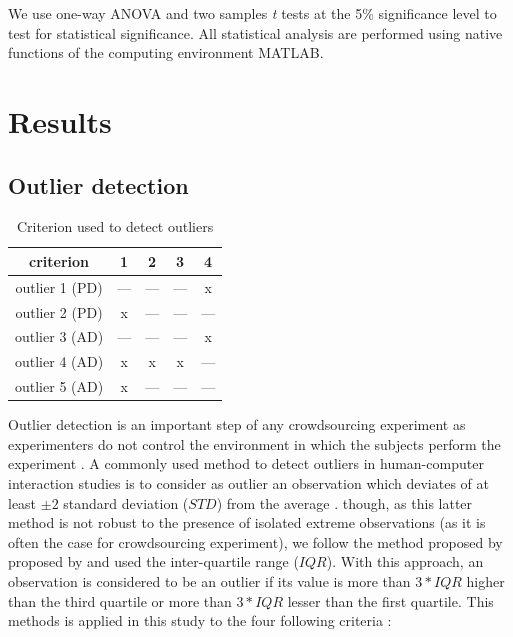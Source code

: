 \documentclass{aes2e}
\begin{document}
We use one-way ANOVA and two samples \textit{t} tests at the 5\% significance level to test for statistical significance. All statistical analysis are performed using native functions of the computing environment MATLAB.


\section{Results} \label{results}
\subsection{Outlier detection}

\begin{table}[t]
\caption{\label{tab1} Criterion used to detect outliers}
\begin{center}
\begin{tabular}{ccccc}
criterion      &  1  &  2  &  3  &  4  \\
\hline
outlier 1 (PD) & --- & --- & --- &  x  \\
outlier 2 (PD) &  x  & --- & --- & --- \\  
outlier 3 (AD) & --- & --- & --- &  x \\
outlier 4 (AD) &  x  &  x  &  x  & --- \\
outlier 5 (AD) &  x  & --- & --- & --- \\
\hline
\end{tabular}
\end{center}
\end{table} 

Outlier detection is an important step of any crowdsourcing experiment as experimenters do not control the environment in which the subjects perform the experiment \cite{komarov2013crowdsourcing,buchholz2011crowdsourcing}. A commonly used method to detect outliers in  human-computer interaction studies is to consider as outlier an observation  which deviates of at least $\pm2$ standard deviation ($STD$) from the average \cite{komarov2013crowdsourcing}. though, as this latter method is not robust to the presence of isolated extreme observations (as it is often the case for crowdsourcing experiment), we follow the  method proposed by proposed by \cite{komarov2013crowdsourcing} and used the inter-quartile range ($IQR$). With this approach, an observation is considered to be an outlier if its value is more than $3*IQR$ higher than the third quartile or more than $3*IQR$ lesser than the first quartile. This methods is applied in this study to the four following criteria :
\end{document}
